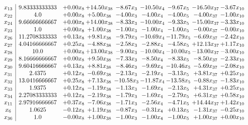 \documentclass[8pt]{article}
\begin{document}
\[\begin{array}{c| c c@{\hskip 2pt} c@{\hskip 2pt} c@{\hskip 2pt} c@{\hskip 2pt} c@{\hskip 2pt} c@{\hskip 2pt} c@{\hskip 2pt} }
 x_{13}   &  9.83333333333 & +  0.00 x_{8} & + 14.50 x_{38} & -8.67 x_{3} & -10.50 x_{4} & -9.67 x_{5} & -16.50 x_{37} & -3.67 x_{10}\\
 x_{22}   &  4.0 & +  0.00 x_{8} & +  5.00 x_{38} & -4.00 x_{3} & -4.00 x_{4} & -4.00 x_{5} & -4.00 x_{37} & -1.00 x_{10}\\
 x_{24}   &  9.66666666667 & +  0.00 x_{8} & + 14.00 x_{38} & -8.33 x_{3} & -10.00 x_{4} & -9.33 x_{5} & -15.00 x_{37} & -3.33 x_{10}\\
 x_{23}   &  1.0 & +  0.00 x_{8} & +  1.00 x_{38} & -1.00 x_{3} & -1.00 x_{4} & -1.00 x_{5} & -0.00 x_{37} & -0.00 x_{10}\\
 x_{26}   &  11.2708333333 & +  0.13 x_{8} & +  9.81 x_{38} & -9.79 x_{3} & -10.69 x_{4} & -11.79 x_{5} & -6.69 x_{37} & -2.42 x_{10}\\
 x_{27}   &  4.04166666667 & +  0.25 x_{8} & -4.88 x_{38} & -2.58 x_{3} & -2.88 x_{4} & -4.58 x_{5} & + 12.13 x_{37} & +  1.17 x_{10}\\
 x_{28}   &  10.0 & +  0.00 x_{8} & + 13.00 x_{38} & -9.00 x_{3} & -10.00 x_{4} & -10.00 x_{5} & -13.00 x_{37} & -3.00 x_{10}\\
 x_{29}   &  8.16666666667 & +  0.00 x_{8} & +  9.50 x_{38} & -7.33 x_{3} & -8.50 x_{4} & -8.33 x_{5} & -8.50 x_{37} & -2.33 x_{10}\\
 x_{30}   &  9.60416666667 & +  0.13 x_{8} & +  8.81 x_{38} & -8.46 x_{3} & -9.69 x_{4} & -10.46 x_{5} & -5.69 x_{37} & -2.08 x_{10}\\
 x_{31}   &  2.4375 & +  0.12 x_{8} & -0.69 x_{38} & -2.13 x_{3} & -2.19 x_{4} & -3.13 x_{5} & +  3.81 x_{37} & +  0.25 x_{10}\\
 x_{32}   &  13.0416666667 & +  0.25 x_{8} & +  7.13 x_{38} & -10.58 x_{3} & -11.87 x_{4} & -13.58 x_{5} & -0.88 x_{37} & -1.83 x_{10}\\
 x_{33}   &  1.9375 & +  0.12 x_{8} & -1.19 x_{38} & -1.13 x_{3} & -1.69 x_{4} & -2.13 x_{5} & +  4.31 x_{37} & +  0.25 x_{10}\\
 x_{34}   &  2.27083333333 & +  0.12 x_{8} & -2.19 x_{38} & -1.79 x_{3} & -1.69 x_{4} & -2.79 x_{5} & +  6.31 x_{37} & +  0.58 x_{10}\\
 x_{11}   &  2.97916666667 & +  0.37 x_{8} & -7.06 x_{38} & -1.71 x_{3} & -2.56 x_{4} & -4.71 x_{5} & + 14.44 x_{37} & +  1.42 x_{10}\\
 x_{6}   &  1.0625 & -0.12 x_{8} & +  1.19 x_{38} & -0.87 x_{3} & -0.31 x_{4} & +  0.13 x_{5} & -1.31 x_{37} & -0.25 x_{10}\\
 x_{36}   &  1.0 & -0.00 x_{8} & +  1.00 x_{38} & -1.00 x_{3} & -1.00 x_{4} & -1.00 x_{5} & +  1.00 x_{37} & +  0.00 x_{10}\\

\end{array}\]
\end{document}
